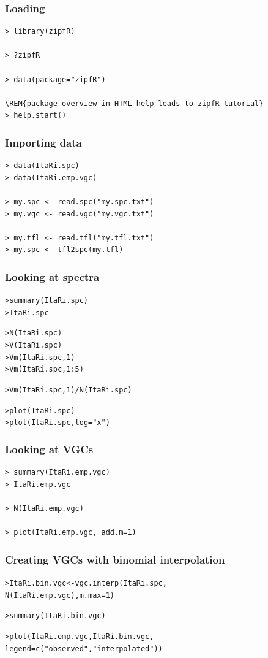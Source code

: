 \documentclass[handout,notes=show,t]{beamer} %
\begin{document}
\begin{frame}[fragile]
  \frametitle{Loading}

\begin{verbatim}
> library(zipfR)

> ?zipfR

> data(package="zipfR")

\REM{package overview in HTML help leads to zipfR tutorial}
> help.start() 
\end{verbatim}

\end{frame}


\begin{frame}[fragile]
  \frametitle{Importing data}

\begin{verbatim}
> data(ItaRi.spc)
> data(ItaRi.emp.vgc)

> my.spc <- read.spc("my.spc.txt")
> my.vgc <- read.vgc("my.vgc.txt")

> my.tfl <- read.tfl("my.tfl.txt")
> my.spc <- tfl2spc(my.tfl)
\end{verbatim}

\end{frame}

\begin{frame}[fragile]
  \frametitle{Looking at spectra}

\begin{alltt}
> summary(ItaRi.spc)
> ItaRi.spc

> N(ItaRi.spc)
> V(ItaRi.spc)
> Vm(ItaRi.spc,1)
> Vm(ItaRi.spc,1:5)

> Vm(ItaRi.spc,1) / N(ItaRi.spc)

> plot(ItaRi.spc)
> plot(ItaRi.spc, log="x")
\end{alltt}
\end{frame}

\begin{frame}[fragile]
  \frametitle{Looking at VGCs}

\begin{verbatim}
> summary(ItaRi.emp.vgc)
> ItaRi.emp.vgc

> N(ItaRi.emp.vgc)

> plot(ItaRi.emp.vgc, add.m=1)
\end{verbatim}
\end{frame}

\begin{frame}[fragile]
  \frametitle{Creating VGCs with binomial interpolation}

\begin{alltt}

> ItaRi.bin.vgc <- vgc.interp(ItaRi.spc,
  N(ItaRi.emp.vgc), m.max=1)

> summary(ItaRi.bin.vgc)


> plot(ItaRi.emp.vgc, ItaRi.bin.vgc,
  legend=c("observed","interpolated"))
\end{alltt}


\end{frame}
\end{document}
